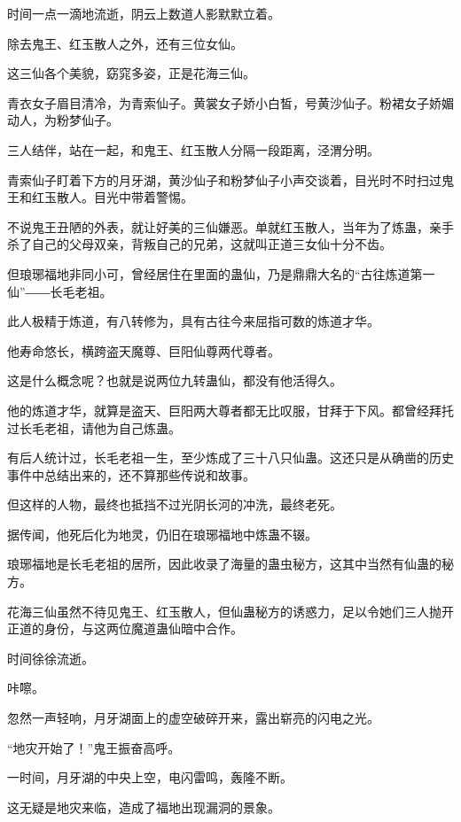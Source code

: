 
\begin{this_body}

时间一点一滴地流逝，阴云上数道人影默默立着。

除去鬼王、红玉散人之外，还有三位女仙。

这三仙各个美貌，窈窕多姿，正是花海三仙。

青衣女子眉目清冷，为青索仙子。黄裳女子娇小白皙，号黄沙仙子。粉裙女子娇媚动人，为粉梦仙子。

三人结伴，站在一起，和鬼王、红玉散人分隔一段距离，泾渭分明。

青索仙子盯着下方的月牙湖，黄沙仙子和粉梦仙子小声交谈着，目光时不时扫过鬼王和红玉散人。目光中带着警惕。

不说鬼王丑陋的外表，就让好美的三仙嫌恶。单就红玉散人，当年为了炼蛊，亲手杀了自己的父母双亲，背叛自己的兄弟，这就叫正道三女仙十分不齿。

但琅琊福地非同小可，曾经居住在里面的蛊仙，乃是鼎鼎大名的“古往炼道第一仙”――长毛老祖。

此人极精于炼道，有八转修为，具有古往今来屈指可数的炼道才华。

他寿命悠长，横跨盗天魔尊、巨阳仙尊两代尊者。

这是什么概念呢？也就是说两位九转蛊仙，都没有他活得久。

他的炼道才华，就算是盗天、巨阳两大尊者都无比叹服，甘拜于下风。都曾经拜托过长毛老祖，请他为自己炼蛊。

有后人统计过，长毛老祖一生，至少炼成了三十八只仙蛊。这还只是从确凿的历史事件中总结出来的，还不算那些传说和故事。

但这样的人物，最终也抵挡不过光阴长河的冲洗，最终老死。

据传闻，他死后化为地灵，仍旧在琅琊福地中炼蛊不辍。

琅琊福地是长毛老祖的居所，因此收录了海量的蛊虫秘方，这其中当然有仙蛊的秘方。

花海三仙虽然不待见鬼王、红玉散人，但仙蛊秘方的诱惑力，足以令她们三人抛开正道的身份，与这两位魔道蛊仙暗中合作。

时间徐徐流逝。

咔嚓。

忽然一声轻响，月牙湖面上的虚空破碎开来，露出崭亮的闪电之光。

“地灾开始了！”鬼王振奋高呼。

一时间，月牙湖的中央上空，电闪雷鸣，轰隆不断。

这无疑是地灾来临，造成了福地出现漏洞的景象。


\end{this_body}
